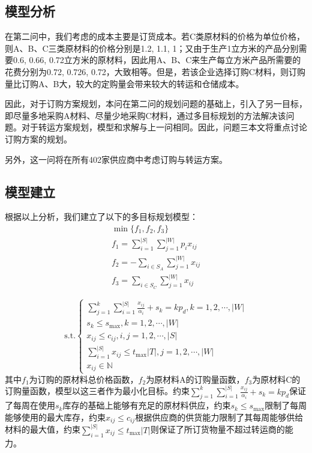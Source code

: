 \documentclass[withoutpreface,bwprint]{cumcmthesis} %
\begin{document}
\subsection{模型分析}
在第二问中，我们考虑的成本主要是订货成本。若C类原材料的价格为单位价格，则A、B、C三类原材料的价格分别是1.2, 1.1, 1；又由于生产1立方米的产品分别需要0.6, 0.66, 0.72立方米的原材料，因此用A、B、C来生产每立方米产品所需要的花费分别为0.72, 0.726, 0.72，大致相等。但是，若该企业选择订购C材料，则订购量比订购A、B大，较大的定购量会带来较大的转运和仓储成本。

因此，对于订购方案规划，本问在第二问的规划问题的基础上，引入了另一目标，即尽量多地采购A材料、尽量少地采购C材料，通过多目标规划的方法解决该问题。对于转运方案规划，模型和求解与上一问相同。因此，问题三本文将重点讨论订购方案的规划。

另外，这一问将在所有402家供应商中考虑订购与转运方案。

\subsection{模型建立}

根据以上分析，我们建立了以下的多目标规划模型：
\begin{gather}
    \min \{f_1, f_2, f_3\}\\
    f_1 = \sum\limits_{i=1}^{|S|}\sum\limits_{j=1}^{|W|}p_i x_{ij}\\
    f_2 = -\sum\limits_{i \in S_A}\sum\limits_{j=1}^{|W|}x_{ij}\\
    f_3 = \sum\limits_{i \in S_C}\sum\limits_{j=1}^{|W|}x_{ij}
\end{gather}

\begin{equation}
    \mathrm{s.t.}
    \begin{cases}
        \sum\limits_{j = 1}^{k}  \sum\limits_{i = 1}^{|S|} \frac{x_{ij}}{\alpha_i}+s_k=kp_d, k=1,2,\cdots,|W|\\
        s_k\leq s_{\mathrm{max}}, k=1,2,\cdots,|W|\\
        x_{ij}\leq c_{ij}, i,j = 1,2,\cdots,|S|\\
        \sum\limits_{i = 1}^{|S|} x_{ij} \leq t_{\mathrm{max}}|T|, j = 1,2,\cdots,|W|\\
        x_{ij} \in \mathbb{N}
    \end{cases}
\end{equation}
其中$f_1$为订购的原材料总价格函数，$f_2$为原材料A的订购量函数，$f_3$为原材料C的订购量函数，模型以这三者作为最小化目标。约束$\sum\limits_{j = 1}^{k}  \sum\limits_{i = 1}^{|S|} \frac{x_{ij}}{\alpha_i}+s_k=kp_d$保证了每周在使用$s_k$库存的基础上能够有充足的原材料供应，约束$s_k\leq s_{\mathrm{max}}$限制了每周能够使用的最大库存，约束$x_{ij}\leq c_{ij}$根据供应商的供货能力限制了其每周能够供给材料的最大值，约束$\sum\limits_{i = 1}^{|S|} x_{ij} \leq t_{\mathrm{max}}|T|$则保证了所订货物量不超过转运商的能力。
\end{document}
